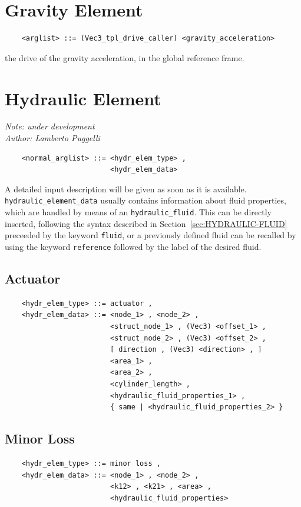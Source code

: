 \section{Gravity Element}
\begin{verbatim}
    <arglist> ::= (Vec3_tpl_drive_caller) <gravity_acceleration>
\end{verbatim}
the drive of the gravity acceleration, in the global reference frame.




\section{Hydraulic Element}\label{sec:HYDRAULIC-ELEMENT}
{\em 
    Note: under development \\
    Author: Lamberto Puggelli
}
\begin{verbatim}
    <normal_arglist> ::= <hydr_elem_type> , 
                         <hydr_elem_data>
\end{verbatim}
A detailed input description will be given as soon as it is available. \\
\texttt{hydraulic\_element\_data} usually contains information about fluid
properties, which are handled by means of an \texttt{hydraulic\_fluid}.
This can be directly inserted, following the syntax described in
Section~\ref{sec:HYDRAULIC-FLUID} preceeded by the keyword \texttt{fluid}, or a
previously defined fluid can be recalled by using the keyword 
\texttt{reference} followed by the label of the desired fluid.

\subsection{Actuator}
\begin{verbatim}
    <hydr_elem_type> ::= actuator ,
    <hydr_elem_data> ::= <node_1> , <node_2> , 
                         <struct_node_1> , (Vec3) <offset_1> ,
                         <struct_node_2> , (Vec3) <offset_2> ,
                         [ direction , (Vec3) <direction> , ]
                         <area_1> ,
                         <area_2> ,
                         <cylinder_length> ,
                         <hydraulic_fluid_properties_1> ,
                         { same | <hydraulic_fluid_properties_2> }
\end{verbatim}

\subsection{Minor Loss}
\begin{verbatim}
    <hydr_elem_type> ::= minor loss ,
    <hydr_elem_data> ::= <node_1> , <node_2> ,
                         <k12> , <k21> , <area> ,
                         <hydraulic_fluid_properties>
\end{verbatim}


